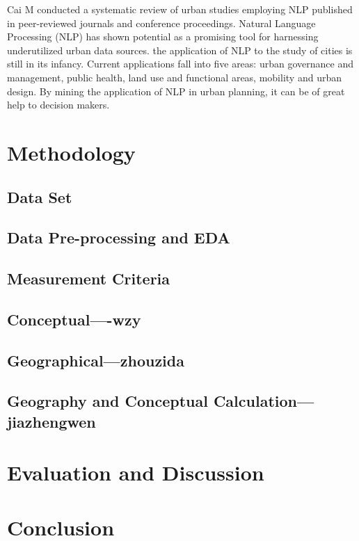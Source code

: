 Cai M conducted a systematic review of urban studies employing NLP published in peer-reviewed journals and conference proceedings. Natural Language Processing (NLP) has shown potential as a promising tool for harnessing underutilized urban data sources. the application of NLP to the study of cities is still in its infancy. Current applications fall into five areas: urban governance and management, public health, land use and functional areas, mobility and urban design. By mining the application of NLP in urban planning, it can be of great help to decision makers.


\section* {Methodology}
\subsection* {Data Set}
\subsection*{Data Pre-processing and EDA}
\subsection*{Measurement Criteria}

\subsection*{Conceptual----wzy}
\subsection*{Geographical---zhouzida}

\subsection*{Geography and Conceptual Calculation---jiazhengwen}


\section*{Evaluation and Discussion}

\section*{Conclusion}







